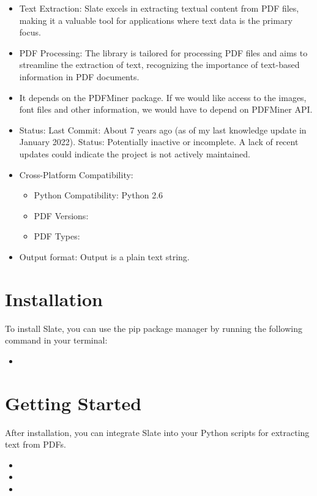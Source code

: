 \begin{itemize}
    \item Text Extraction: Slate excels in extracting textual content from PDF files, making it a valuable tool for applications where text data is the primary focus.
    \item PDF Processing: The library is tailored for processing PDF files and aims to streamline the extraction of text, recognizing the importance of text-based information in PDF documents.
    \item It depends on the PDFMiner package. If we would like access to the images, font files and other information, we would have to depend on PDFMiner API.  
    \item Status: Last Commit: About 7 years ago (as of my last knowledge update in January 2022). Status: Potentially inactive or incomplete. A lack of recent updates could indicate the project is not actively maintained.
    \item Cross-Platform Compatibility: 
    \begin{itemize}
    \item Python Compatibility: Python 2.6
    \item PDF Versions: 
    \item PDF Types: 
    \end{itemize}
    \item Output format: Output is a plain text string. 
\end{itemize}

\section{Installation}

To install Slate, you can use the pip package manager by running the following command in your terminal:

\begin{itemize}
    \item[] 
\end{itemize}

\section{Getting Started}

After installation, you can integrate Slate into your Python scripts for extracting text from PDFs.

\begin{itemize}
    \item[] 
    \item[] 
    \item[] 
\end{itemize}

